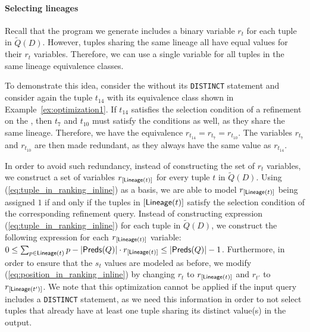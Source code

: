 \paragraph*{\textbf{Selecting lineages}} 
Recall that the program we generate includes a binary variable $r_t$ for each tuple in $\widetilde{Q}(D)$. However, tuples sharing the same lineage all have equal values for their $r_t$ variables. Therefore, we can use a single variable for all tuples in the same lineage equivalence classes. 

\begin{example}
    To demonstrate this idea, consider the \running{} without its {\tt DISTINCT} statement and consider again the tuple $t_{14}$ with its equivalence class shown in Example~\ref{ex:optimization1}. If $t_{14}$ satisfies the selection condition of a refinement on the \running{}, then $t_7$ and $t_{10}$ must satisfy the conditions as well, as they share the same lineage. Therefore, we have the equivalence $r_{t_{14}} = r_{t_7} = r_{t_{10}}$. The variables $r_{t_7}$ and $r_{t_{10}}$ are then made redundant, as they always have the same value as $r_{t_{14}}$. 
\end{example}

In order to avoid such redundancy, instead of constructing the set of $r_t$ variables, we construct a set of variables $r_{[\textsf{Lineage}(t)]}$ for every tuple $t$ in $\widetilde{Q}(D)$. Using (\ref{eq:tuple_in_ranking_inline}) as a basis, we are able to model $r_{[\textsf{Lineage}(t)]}$ being assigned $1$ if and only if the tuples in $[\textsf{Lineage}(t)]$ satisfy the selection condition of the corresponding refinement query.
 Instead of constructing expression (\ref{eq:tuple_in_ranking_inline}) for each tuple in $\widetilde{Q}(D)$, we construct the following expression for each $r_{[\textsf{Lineage}(t)]}$ variable:
    $0 \leq \sum_{p \in \textsf{Lineage}(t)} p - |\textsf{Preds}(Q)| \cdot r_{[\textsf{Lineage}(t)]} \leq |\textsf{Preds}(Q)| - 1$.
Furthermore, in order to ensure that the $s_t$ values are modeled as before, we modify (\ref{eq:position_in_ranking_inline}) by changing $r_t$ to $r_{[\textsf{Lineage}(t)]}$ and $r_{t'}$ to $r_{[\textsf{Lineage}(t')]}$.
We note that this optimization cannot be applied if the input query includes a {\tt DISTINCT} statement,
as we need this information in order to not select tuples that already have at least one tuple sharing its distinct value(s) in the output.

